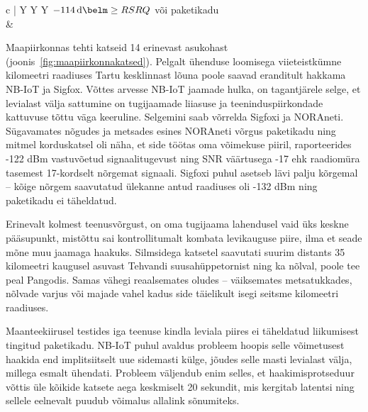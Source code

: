 \documentclass[12pt]{article}
\begin{document}
\begin{table}[h]
{\begin{tabularx}{\textwidth}{ c | Y  Y  Y }
                \scriptsize{$\SI{-114}{\deci\belm} \geq RSRQ$} \newline \footnotesize{või paketikadu} \\
                 &
        \end{tabularx}
    }
    \label{tab:levid}
    \end{table}

    Maapiirkonnas tehti katseid 14 erinevast asukohast (joonis~\ref{fig:maapiirkonnakatsed}). Pelgalt ühenduse loomisega viieteistkümne kilomeetri raadiuses Tartu kesklinnast lõuna poole saavad eranditult hakkama NB-IoT ja Sigfox.
    Võttes arvesse NB-IoT jaamade hulka, on tagantjärele selge, et levialast välja sattumine on tugijaamade liiasuse ja teeninduspiirkondade kattuvuse tõttu väga keeruline.
    Selgemini saab võrrelda Sigfoxi ja NORAneti.
    Sügavamates nõgudes ja metsades esines NORAneti võrgus paketikadu ning mitmel korduskatsel oli näha, et side töötas oma võimekuse piiril, raporteerides -122 dBm vastuvõetud signaalitugevust ning SNR väärtusega -17 ehk raadiomüra tasemest 17-kordselt nõrgemat signaali.
    Sigfoxi puhul asetseb lävi palju kõrgemal -- kõige nõrgem saavutatud ülekanne antud raadiuses oli -132 dBm ning paketikadu ei täheldatud.

    Erinevalt kolmest teenusvõrgust, on oma tugijaama lahendusel vaid üks keskne pääsupunkt, mistõttu sai kontrollitumalt kombata levikauguse piire, ilma et seade mõne muu jaamaga haakuks.
    Silmsidega katsetel saavutati suurim distants 35 kilomeetri kaugusel asuvast Tehvandi suusahüppetornist ning ka nõlval, poole tee peal Pangodis.
    Samas vähegi reaalsemates oludes -- väiksemates metsatukkades, nõlvade varjus või majade vahel kadus side täielikult isegi seitsme kilomeetri raadiuses.

    Maanteekiirusel testides iga teenuse kindla leviala piires ei täheldatud liikumisest tingitud paketikadu.
    NB-IoT puhul avaldus probleem hoopis selle võimetusest haakida end implitsiitselt uue sidemasti külge, jõudes selle masti levialast välja, millega esmalt ühendati.
    Probleem väljendub enim selles, et haakimisprotseduur võttis üle kõikide katsete aega keskmiselt 20 sekundit, mis kergitab latentsi ning sellele eelnevalt puudub võimalus allalink sõnumiteks.
\end{document}
